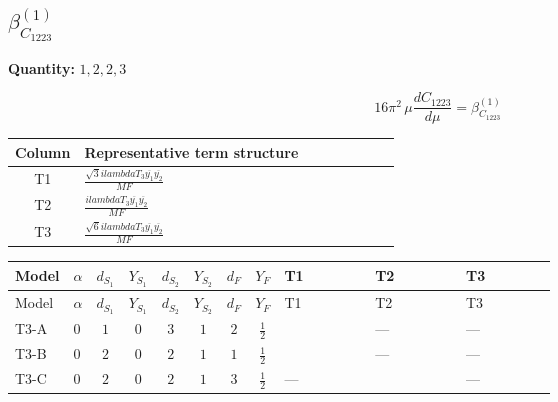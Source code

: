 \documentclass[8pt]{article}
\begin{document}
\begin{landscape}
\section*{$\beta_{C_{1223}}^{(1)}$}
\noindent\textbf{Quantity: }$\mathrm{1,2,2,3}$\par\smallskip
\[16\pi^2\,\mu\frac{d C_{1223}}{d\mu}=\beta_{C_{1223}}^{(1)}\]
\begin{center}
\begin{tabular}{@{}c >{\raggedright\arraybackslash}p{0.82\linewidth}@{}}
\toprule
Column & Representative term structure \\
\midrule
T1 & \(\displaystyle \frac{\sqrt{3} i lambdaT_{3} \overline{y_{1}} \overline{y_{2}}}{MF}\) \\
\midrule
T2 & \(\displaystyle \frac{i lambdaT_{3} \overline{y_{1}} \overline{y_{2}}}{MF}\) \\
\midrule
T3 & \(\displaystyle \frac{\sqrt{6} i lambdaT_{3} \overline{y_{1}} \overline{y_{2}}}{MF}\) \\
\midrule
\bottomrule
\end{tabular}
\end{center}
\smallskip
\tiny
\begin{longtable}{@{}llcccccc >{\raggedright\arraybackslash}p{0.21\linewidth} >{\raggedright\arraybackslash}p{0.21\linewidth} >{\raggedright\arraybackslash}p{0.21\linewidth}@{}}
\toprule
Model & $\alpha$ & $d_{S_1}$ & $Y_{S_1}$ & $d_{S_2}$ & $Y_{S_2}$ & $d_F$ & $Y_F$ & T1 & T2 & T3 \\
\midrule
\endfirsthead
\toprule
Model & $\alpha$ & $d_{S_1}$ & $Y_{S_1}$ & $d_{S_2}$ & $Y_{S_2}$ & $d_F$ & $Y_F$ & T1 & T2 & T3 \\
\midrule
\endhead
T3-A & $0$ & $1$ & $0$ & $3$ & $1$ & $2$ & $\frac{1}{2}$ & \scriptsize\adjustbox{max width=\linewidth}{$\begin{gathered} - \frac{\sqrt{3} i lambdaT_{3} \overline{y_{1}} \overline{y_{2}}}{3 MF}\end{gathered}$} & --- & --- \\
\midrule
T3-B & $0$ & $2$ & $0$ & $2$ & $1$ & $1$ & $\frac{1}{2}$ & \scriptsize\adjustbox{max width=\linewidth}{$\begin{gathered} - \frac{\sqrt{3} i lambdaT_{3} \overline{y_{1}} \overline{y_{2}}}{3 MF}\end{gathered}$} & --- & --- \\
\midrule
T3-C & $0$ & $2$ & $0$ & $2$ & $1$ & $3$ & $\frac{1}{2}$ & --- & \scriptsize\adjustbox{max width=\linewidth}{$\begin{gathered} \frac{i lambdaT_{3} \overline{y_{1}} \overline{y_{2}}}{3 MF}\end{gathered}$} & --- \\

\end{longtable}
\end{landscape}
\end{document}
